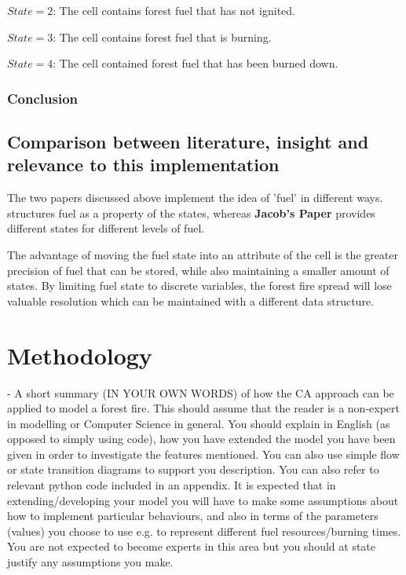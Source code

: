 \documentclass[11pt, a4paper, titlepage]{article}
\begin{document}
  $State = 2$: The cell contains forest fuel that has not ignited.
  
  $State = 3$: The cell contains forest fuel that is burning.
  
  $State = 4$: The cell contained forest fuel that has been burned down.
  
  
  \subsubsection{Conclusion}

  \subsection{Comparison between literature, insight and relevance to this implementation}
  The two papers discussed above implement the idea of 'fuel' in different ways. \cite{ALEXANDRIDIS2008191} structures fuel as a property of the states, whereas \textbf{Jacob's Paper} provides different states for different levels of fuel. 
  
  The advantage of moving the fuel state into an attribute of the cell is the greater precision of fuel that can be stored, while also maintaining a smaller amount of states. By limiting fuel state to discrete variables, the forest fire spread will lose valuable resolution which can be maintained with a different data structure.

\section{Methodology}
\begin{displayquote}
  - A short summary (IN YOUR OWN WORDS) of how the CA approach can
  be applied to model a forest fire. This should assume that the reader is a non-expert in modelling or
  Computer Science in general. You should explain in English (as opposed to simply using code), how
  you have extended the model you have been given in order to investigate the features mentioned.
  You can also use simple flow or state transition diagrams to support you description. You can also
  refer to relevant python code included in an appendix.
  It is expected that in extending/developing your model you will have to make some assumptions
  about how to implement particular behaviours, and also in terms of the parameters (values) you
  choose to use e.g. to represent different fuel resources/burning times. You are not expected to
  become experts in this area but you should at state justify any assumptions you make.
\end{displayquote}
\end{document}
